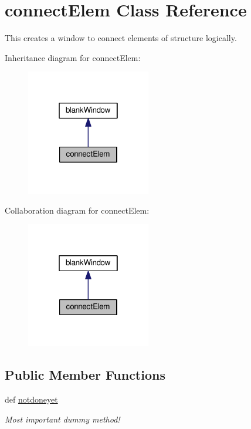 \hypertarget{classgui_1_1window2_1_1connectElem}{\section{connect\-Elem Class Reference}
\label{classgui_1_1window2_1_1connectElem}
}


This creates a window to connect elements of structure logically.  




Inheritance diagram for connect\-Elem\-:\nopagebreak
\begin{figure}[H]
\begin{center}
\leavevmode
\includegraphics[width=154pt]{classgui_1_1window2_1_1connectElem__inherit__graph}
\end{center}
\end{figure}


Collaboration diagram for connect\-Elem\-:\nopagebreak
\begin{figure}[H]
\begin{center}
\leavevmode
\includegraphics[width=154pt]{classgui_1_1window2_1_1connectElem__coll__graph}
\end{center}
\end{figure}
\subsection*{Public Member Functions}
\begin{DoxyCompactItemize}
\item 
\hypertarget{classgui_1_1window2_1_1connectElem_a615f3073891733337c33f599f89ec7ef}{def \hyperlink{classgui_1_1window2_1_1connectElem_a615f3073891733337c33f599f89ec7ef}{notdoneyet}}\label{classgui_1_1window2_1_1connectElem_a615f3073891733337c33f599f89ec7ef}

\begin{DoxyCompactList}\small\item\em Most important dummy method! \end{DoxyCompactList}\end{DoxyCompactItemize}


